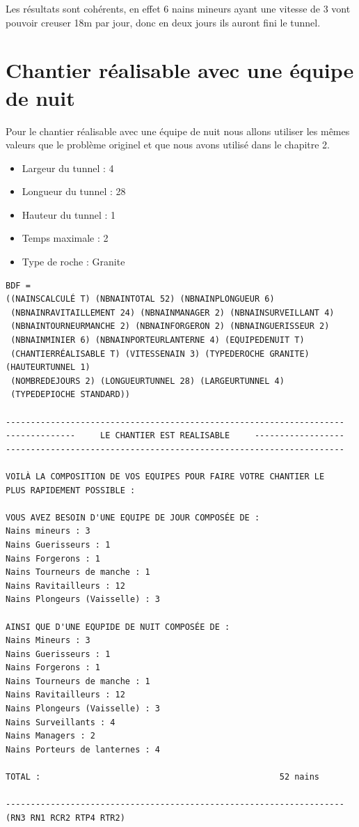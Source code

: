 \documentclass[a4paper,10pt]{report}
\begin{document}
  Les résultats sont cohérents, en effet 6 nains mineurs ayant une vitesse de 3 vont pouvoir creuser 18m par jour, donc en deux jours ils auront fini le tunnel.
  
  \newpage
  \section{Chantier réalisable avec une équipe de nuit}
  Pour le chantier réalisable avec une équipe de nuit nous allons utiliser les mêmes valeurs que le problème originel et que nous avons utilisé dans le chapitre 2. 
  \begin{itemize}
     \item Largeur du tunnel : 4
     \item Longueur du tunnel : 28
     \item Hauteur du tunnel : 1
     \item Temps maximale : 2
     \item Type de roche : Granite
    \end{itemize}
  \begin{lstlisting}[basicstyle = \footnotesize]
BDF = 
((NAINSCALCULÉ T) (NBNAINTOTAL 52) (NBNAINPLONGUEUR 6)
 (NBNAINRAVITAILLEMENT 24) (NBNAINMANAGER 2) (NBNAINSURVEILLANT 4)
 (NBNAINTOURNEURMANCHE 2) (NBNAINFORGERON 2) (NBNAINGUERISSEUR 2)
 (NBNAINMINIER 6) (NBNAINPORTEURLANTERNE 4) (EQUIPEDENUIT T)
 (CHANTIERRÉALISABLE T) (VITESSENAIN 3) (TYPEDEROCHE GRANITE) (HAUTEURTUNNEL 1)
 (NOMBREDEJOURS 2) (LONGUEURTUNNEL 28) (LARGEURTUNNEL 4)
 (TYPEDEPIOCHE STANDARD))

--------------------------------------------------------------------
--------------     LE CHANTIER EST REALISABLE     ------------------
--------------------------------------------------------------------

VOILÀ LA COMPOSITION DE VOS EQUIPES POUR FAIRE VOTRE CHANTIER LE 
PLUS RAPIDEMENT POSSIBLE : 

VOUS AVEZ BESOIN D'UNE EQUIPE DE JOUR COMPOSÉE DE : 
Nains mineurs : 3
Nains Guerisseurs : 1
Nains Forgerons : 1
Nains Tourneurs de manche : 1
Nains Ravitailleurs : 12
Nains Plongeurs (Vaisselle) : 3

AINSI QUE D'UNE EQUPIDE DE NUIT COMPOSÉE DE : 
Nains Mineurs : 3
Nains Guerisseurs : 1
Nains Forgerons : 1
Nains Tourneurs de manche : 1
Nains Ravitailleurs : 12
Nains Plongeurs (Vaisselle) : 3
Nains Surveillants : 4
Nains Managers : 2
Nains Porteurs de lanternes : 4

TOTAL :                                                52 nains

--------------------------------------------------------------------
(RN3 RN1 RCR2 RTP4 RTR2)
 \end{lstlisting}
\end{document}
